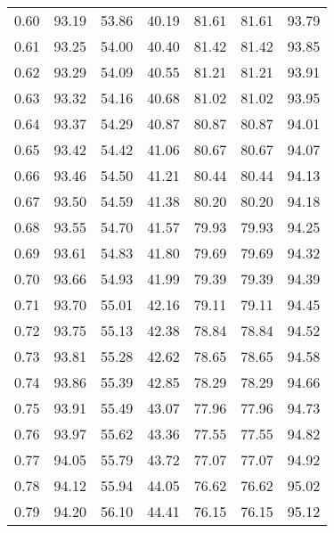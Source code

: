 \begin{tabular}{|c|c|c|c|c|c|c|}
      0.60 &     93.19 &     53.86 &      40.19 &   81.61 &      81.61 &         93.79 \\
      0.61 &     93.25 &     54.00 &      40.40 &   81.42 &      81.42 &         93.85 \\
      0.62 &     93.29 &     54.09 &      40.55 &   81.21 &      81.21 &         93.91 \\
      0.63 &     93.32 &     54.16 &      40.68 &   81.02 &      81.02 &         93.95 \\
      0.64 &     93.37 &     54.29 &      40.87 &   80.87 &      80.87 &         94.01 \\
      0.65 &     93.42 &     54.42 &      41.06 &   80.67 &      80.67 &         94.07 \\
      0.66 &     93.46 &     54.50 &      41.21 &   80.44 &      80.44 &         94.13 \\
      0.67 &     93.50 &     54.59 &      41.38 &   80.20 &      80.20 &         94.18 \\
      0.68 &     93.55 &     54.70 &      41.57 &   79.93 &      79.93 &         94.25 \\
      0.69 &     93.61 &     54.83 &      41.80 &   79.69 &      79.69 &         94.32 \\
      0.70 &     93.66 &     54.93 &      41.99 &   79.39 &      79.39 &         94.39 \\
      0.71 &     93.70 &     55.01 &      42.16 &   79.11 &      79.11 &         94.45 \\
      0.72 &     93.75 &     55.13 &      42.38 &   78.84 &      78.84 &         94.52 \\
      0.73 &     93.81 &     55.28 &      42.62 &   78.65 &      78.65 &         94.58 \\
      0.74 &     93.86 &     55.39 &      42.85 &   78.29 &      78.29 &         94.66 \\
      0.75 &     93.91 &     55.49 &      43.07 &   77.96 &      77.96 &         94.73 \\
      0.76 &     93.97 &     55.62 &      43.36 &   77.55 &      77.55 &         94.82 \\
      0.77 &     94.05 &     55.79 &      43.72 &   77.07 &      77.07 &         94.92 \\
      0.78 &     94.12 &     55.94 &      44.05 &   76.62 &      76.62 &         95.02 \\
      0.79 &     94.20 &     56.10 &      44.41 &   76.15 &      76.15 &         95.12 \\

\end{tabular}
